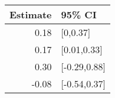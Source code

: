 \begin{tabular}{rl}
  \hline
Estimate & 95\% CI \\ 
  \hline
0.18 & [0,0.37] \\ 
  0.17 & [0.01,0.33] \\ 
  0.30 & [-0.29,0.88] \\ 
  -0.08 & [-0.54,0.37] \\ 
   \hline
\end{tabular}

